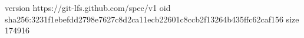 version https://git-lfs.github.com/spec/v1
oid sha256:3231f1ebefdd2798e7627c8d2ca11ecb22601c8ccb2f13264b435ffc62caf156
size 174916

